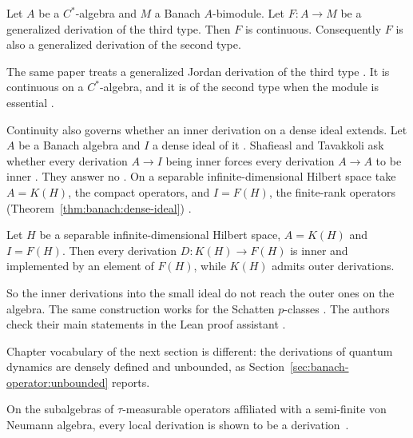 \begin{theorem}\label{thm:banach:three-types}
Let $A$ be a $C^*$-algebra and $M$ a Banach $A$-bimodule. Let $F\colon A\to M$
be a generalized derivation of the third type. Then $F$ is continuous.
Consequently $F$ is also a generalized derivation of the second type.
\end{theorem}

The same paper treats a generalized Jordan derivation of the third type
\cite[p.~5]{HosseiniPeraltaSu2025}. It is continuous on a $C^*$-algebra, and it is of the second type when the module
is essential \cite[Theorem~3.1, p.~5]{HosseiniPeraltaSu2025}.

Continuity also governs whether an inner derivation on a dense ideal extends.
Let $A$ be a Banach algebra and $I$ a dense ideal of it
\cite[p.~1]{ShafieaslTavakkoli2026}. Shafieasl and Tavakkoli ask whether
every derivation $A\to I$ being inner forces every derivation $A\to A$ to be
inner \cite[p.~1]{ShafieaslTavakkoli2026}. They answer no
\cite[p.~1]{ShafieaslTavakkoli2026}. On a separable infinite-dimensional
Hilbert space take $A=K(H)$, the compact operators, and $I=F(H)$, the
finite-rank operators (Theorem~\ref{thm:banach:dense-ideal}) \cite[p.~3]{ShafieaslTavakkoli2026}.

\begin{theorem}\label{thm:banach:dense-ideal}
Let $H$ be a separable infinite-dimensional Hilbert space, $A=K(H)$ and
$I=F(H)$. Then every derivation $D\colon K(H)\to F(H)$ is inner and
implemented by an element of $F(H)$, while $K(H)$ admits outer derivations.
\end{theorem}

So the inner derivations into the small ideal do not reach the outer ones on
the algebra. The same construction works for the Schatten $p$-classes
\cite[Theorem~5.1, p.~4]{ShafieaslTavakkoli2026}. The authors check their
main statements in the Lean proof assistant
\cite[p.~1]{ShafieaslTavakkoli2026}.

Chapter vocabulary of the next section is different:
the derivations of quantum dynamics are densely defined and unbounded, as
Section~\ref{sec:banach-operator:unbounded} reports.

On the subalgebras of $\tau$-measurable operators affiliated with a semi-finite von Neumann algebra, every local derivation is shown to be a derivation~\cite{WlLocalDerivationsOn2015}.

